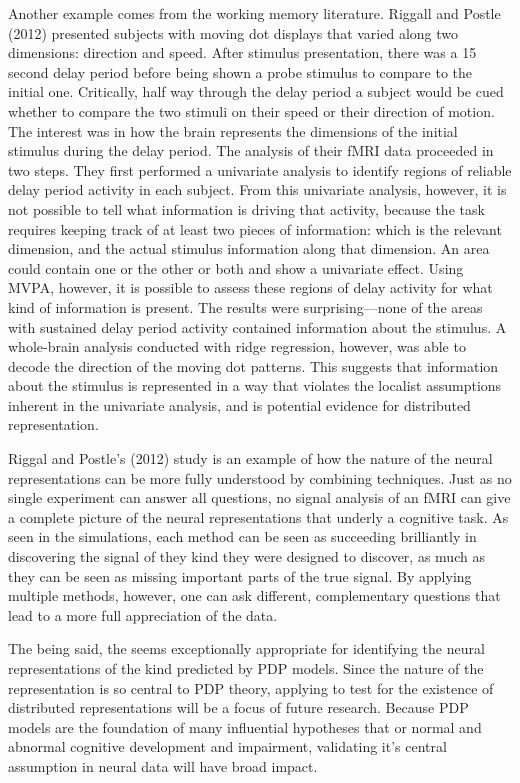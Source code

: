Another example comes from the working memory literature. Riggall and Postle (2012) presented subjects with moving dot displays that varied along two dimensions: direction and speed. After stimulus presentation, there was a 15 second delay period before being shown a probe stimulus to compare to the initial one. Critically, half way through the delay period a subject would be cued whether to compare the two stimuli on their speed or their direction of motion. The interest was in how the brain represents the dimensions of the initial stimulus during the delay period. The analysis of their fMRI data proceeded in two steps. They first performed a univariate analysis to identify regions of reliable delay period activity in each subject. From this univariate analysis, however, it is not possible to tell what information is driving that activity, because the task requires keeping track of at least two pieces of information: which is the relevant dimension, and the actual stimulus information along that dimension. An area could contain one or the other or both and show a univariate effect. Using MVPA, however, it is possible to assess these regions of delay activity for what kind of information is present. The results were surprising---none of the areas with sustained delay period activity contained information about the stimulus. A whole-brain analysis conducted with ridge regression, however, was able to decode the direction of the moving dot patterns. This suggests that information about the stimulus is represented in a way that violates the localist assumptions inherent in the univariate analysis, and is potential evidence for distributed representation.

Riggal and Postle's (2012) study is an example of how the nature of the neural representations can be more fully understood by combining techniques. Just as no single experiment can answer all questions, no signal analysis of an fMRI can give a complete picture of the neural representations that underly a cognitive task. As seen in the simulations, each method can be seen as succeeding brilliantly in discovering the signal of they kind they were designed to discover, as much as they can be seen as missing important parts of the true signal. By applying multiple methods, however, one can ask different, complementary questions that lead to a more full appreciation of the data.

The being said, the \soslasso seems exceptionally appropriate for identifying the neural representations of the kind predicted by PDP models. Since the nature of the representation is so central to PDP theory, applying \soslasso to test for the existence of distributed representations will be a focus of future research. Because PDP models are the foundation of many influential hypotheses that or normal and abnormal cognitive development and impairment, validating it's central assumption in neural data will have broad impact.

